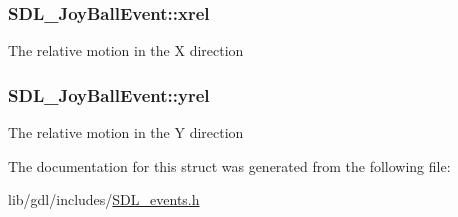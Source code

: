 \subsubsection[{xrel}]{ S\+D\+L\+\_\+\+Joy\+Ball\+Event\+::xrel}\label{struct_s_d_l___joy_ball_event_a959a8473aa1964e5e1778c27a9ffd261}
The relative motion in the X direction \hypertarget{struct_s_d_l___joy_ball_event_a28ad48a9eb7a5d3ff62ccba09fcead76}{}
\subsubsection[{yrel}]{ S\+D\+L\+\_\+\+Joy\+Ball\+Event\+::yrel}\label{struct_s_d_l___joy_ball_event_a28ad48a9eb7a5d3ff62ccba09fcead76}
The relative motion in the Y direction 

The documentation for this struct was generated from the following file\+:\begin{DoxyCompactItemize}
\item 
lib/gdl/includes/\hyperlink{_s_d_l__events_8h}{S\+D\+L\+\_\+events.\+h}\end{DoxyCompactItemize}
